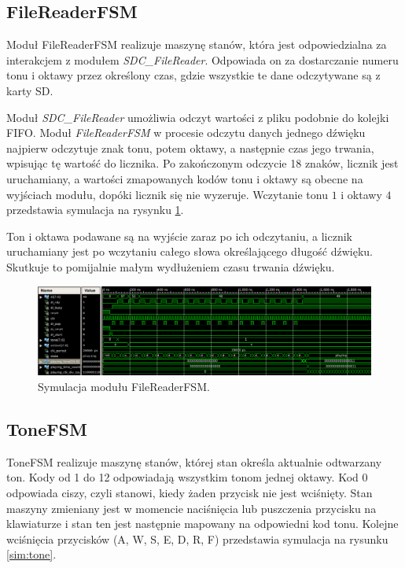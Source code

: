 \documentclass[12pt]{article}
\begin{document}
\subsection{FileReaderFSM}

Moduł FileReaderFSM realizuje maszynę stanów, która jest odpowiedzialna za interakcjem z modułem \textit{SDC\_FileReader}. Odpowiada on za dostarczanie numeru tonu i oktawy przez określony czas, gdzie wszystkie te dane odczytywane są z karty SD.

Moduł \textit{SDC\_FileReader} umożliwia odczyt wartości z pliku podobnie do kolejki FIFO. Moduł \textit{FileReaderFSM} w procesie odczytu danych jednego dźwięku najpierw odczytuje znak tonu, potem oktawy, a następnie czas jego trwania, wpisując tę wartość do licznika. Po zakończonym odczycie 18 znaków, licznik jest uruchamiany, a wartości zmapowanych kodów tonu i oktawy są obecne na wyjściach modułu, dopóki licznik się nie wyzeruje. Wczytanie tonu $1$ i oktawy $4$ przedstawia symulacja na rysynku \ref{sim:fileReader}.

Ton i oktawa podawane są na wyjście zaraz po ich odczytaniu, a licznik uruchamiany jest po wczytaniu całego słowa określającego długość dźwięku. Skutkuje to pomijalnie małym wydłużeniem czasu trwania dźwięku.

\begin{figure}[h]
  \centering
  \includegraphics[decodearray={1 0 1 0 1 0}, width=\linewidth]{images/filereader}
  \caption{Symulacja modułu FileReaderFSM.}
  \label{sim:fileReader}
\end{figure}

\subsection{ToneFSM}
ToneFSM realizuje maszynę stanów, której stan określa aktualnie odtwarzany ton.
Kody od 1 do 12 odpowiadają wszystkim tonom jednej oktawy. Kod 0 odpowiada ciszy, czyli stanowi, kiedy żaden przycisk nie jest wciśnięty. Stan maszyny zmieniany jest w momencie naciśnięcia lub puszczenia przycisku na klawiaturze i stan ten jest następnie mapowany na odpowiedni kod tonu. Kolejne wciśnięcia przycisków (A, W, S, E, D, R, F) przedstawia symulacja na rysunku \ref{sim:tone}.
\end{document}
